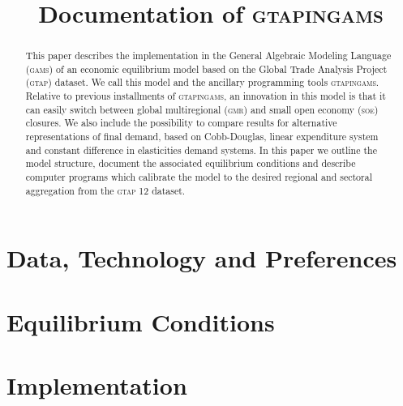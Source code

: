 \documentclass{article}
\newcommand{\SOE}{\textsc{soe}\xspace}
\newcommand{\GMR}{\textsc{gmr}\xspace}
\newcommand{\GAMS}{\textsc{gams}\xspace}
\newcommand{\GTAP}{\textsc{gtap}\xspace}
\newcommand{\GTAPINGAMS}{\textsc{gtapingams}\xspace}
\begin{document}
\title{Documentation of \GTAPINGAMS}
\author{}
\date{}
%
\maketitle

\begin{abstract} %

This paper describes the implementation in the General Algebraic
Modeling Language (\GAMS) of an economic equilibrium model based on
the Global Trade Analysis Project (\GTAP) dataset. We call this model
and the ancillary programming tools \GTAPINGAMS.  Relative to previous
installments of \GTAPINGAMS, an innovation in this model is that it
can easily switch between global multiregional (\GMR) and small open
economy (\SOE) closures. We also include the possibility to compare
results for alternative representations of final demand, based on
Cobb-Douglas, linear expenditure system and constant difference in
elasticities demand systems. In this paper we outline the model
structure, document the associated equilibrium conditions and describe
computer programs which calibrate the model to the desired regional
and sectoral aggregation from the \GTAP12 dataset.

\end{abstract}

\section{Data, Technology and Preferences}\label{model}

\section[Equilibrium conditions]{Equilibrium Conditions}\label{equil}

\section[Implementation]{Implementation}\label{data}


\clearpage

\begin{appendices}






\end{appendices}

\newpage



\end{document}
